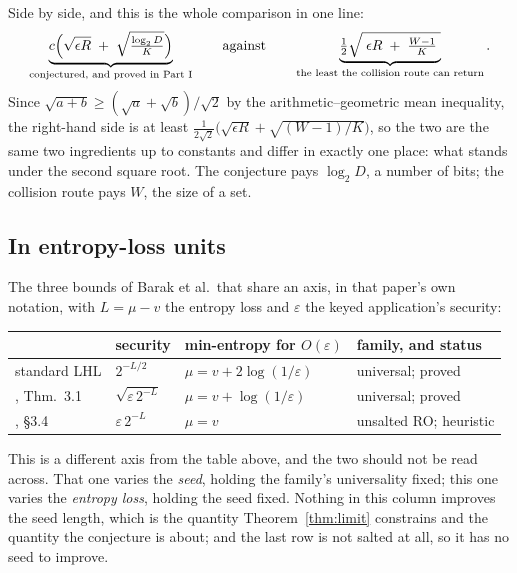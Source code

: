 \documentclass{aicr-solution}
\begin{document}
Side by side, and this is the whole comparison in one line:
\begin{equation}\label{eq:sidebyside}
  \underbrace{c\Bigl(\sqrt{\epsilon R} \;+\; \sqrt{\tfrac{\log_2 D}{K}}\Bigr)}_{\text{conjectured, and proved in Part~I}}
  \qquad\text{against}\qquad
  \underbrace{\tfrac12\sqrt{\;\epsilon R \;+\; \tfrac{W-1}{K}\;}}_{\text{the least the collision route can return}} .
\end{equation}
Since $\sqrt{a+b} \ge (\sqrt a + \sqrt b)/\sqrt2$ by the arithmetic--geometric mean inequality, the
right-hand side is at least $\tfrac{1}{2\sqrt2}\bigl(\sqrt{\epsilon R} + \sqrt{(W-1)/K}\bigr)$, so
the two are the same two ingredients up to constants and differ in exactly one place: what stands
under the second square root. The conjecture pays $\log_2 D$, a number of bits; the collision route
pays $W$, the size of a set.


\subsection*{In entropy-loss units}

The three bounds of Barak et al.\ that share an axis, in that paper's own notation, with
$L = \mu - v$ the entropy loss and $\varepsilon$ the keyed application's security:

\begin{center}\small
\begin{tabular}{@{}llll@{}}
\toprule
 & security & min-entropy for $O(\varepsilon)$ & family, and status \\
\midrule
standard LHL                        & $2^{-L/2}$                    & $\mu = v + 2\log(1/\varepsilon)$ & universal; proved \\
\cite{BDKPPSY11}, Thm.~3.1          & $\sqrt{\varepsilon\,2^{-L}}$  & $\mu = v + \log(1/\varepsilon)$  & universal; proved \\
\cite{BDKPPSY11}, \S3.4             & $\varepsilon\,2^{-L}$         & $\mu = v$                        & unsalted RO; heuristic \\
\bottomrule
\end{tabular}
\end{center}

This is a different axis from the table above, and the two should not be read across. That one
varies the \emph{seed}, holding the family's universality fixed; this one varies the \emph{entropy
loss}, holding the seed fixed. Nothing in this column improves the seed length, which is the
quantity Theorem~\ref{thm:limit} constrains and the quantity the conjecture is about; and the last
row is not salted at all, so it has no seed to improve.
\end{document}

